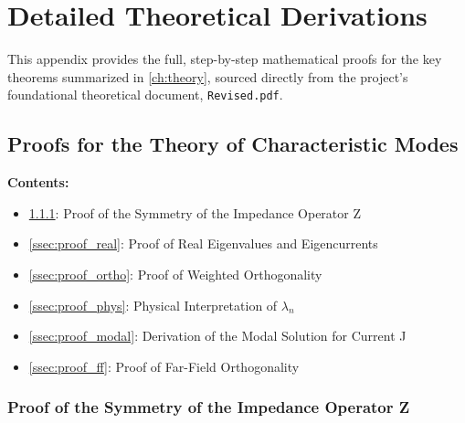 \documentclass[11pt, a4paper]{report}
\begin{document}
\newpage
\chapter{Detailed Theoretical Derivations} \label{app:proofs}
This appendix provides the full, step-by-step mathematical proofs for the key theorems summarized in \cref{ch:theory}, sourced directly from the project's foundational theoretical document, \texttt{Revised.pdf}.

\section{Proofs for the Theory of Characteristic Modes} \label{sec:tcm_proofs}
\noindent\textbf{Contents:}
\begin{itemize}
    \item \cref{ssec:proof_symm}: Proof of the Symmetry of the Impedance Operator Z
    \item \cref{ssec:proof_real}: Proof of Real Eigenvalues and Eigencurrents
    \item \cref{ssec:proof_ortho}: Proof of Weighted Orthogonality
    \item \cref{ssec:proof_phys}: Physical Interpretation of $\lambda_n$
    \item \cref{ssec:proof_modal}: Derivation of the Modal Solution for Current J
    \item \cref{ssec:proof_ff}: Proof of Far-Field Orthogonality
\end{itemize}

\subsection{Proof of the Symmetry of the Impedance Operator Z} \label{ssec:proof_symm}
\end{document}
